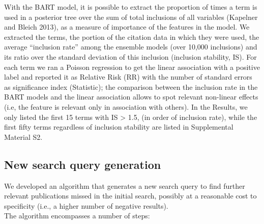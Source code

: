 \documentclass{article}
\begin{document}
With the BART model, it is possible to extract the proportion of times a
term is used in a posterior tree over the sum of total inclusions of all
variables (Kapelner and Bleich 2013), as a measure of importance of the
features in the model. We extracted the terms, the portion of the
citation data in which they were used, the average ``inclusion rate''
among the ensemble models (over 10,000 inclusions) and its ratio over
the standard deviation of this inclusion (inclusion stability, IS). For
each term we ran a Poisson regression to get the linear association with
a positive label and reported it as Relative Risk (RR) with the number
of standard errors as significance index (Statistic); the comparison
between the inclusion rate in the BART models and the linear association
allows to spot relevant non-linear effects (i.e, the feature is relevant
only in association with others). In the Results, we only listed the
first 15 terms with IS \textgreater{} 1.5, (in order of inclusion rate),
while the first fifty terms regardless of inclusion stability are listed
in Supplemental Material S2.

\hypertarget{new-search-query-generation}{%
\subsection{New search query
generation}\label{new-search-query-generation}}

We developed an algorithm that generates a new search query to find
further relevant publications missed in the initial search, possibly at
a reasonable cost to specificity (i.e., a higher number of negative
results).\\
The algorithm encompasses a number of steps:
\end{document}
